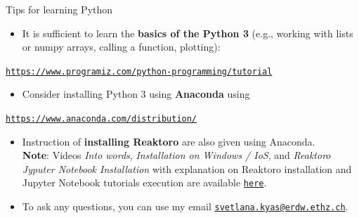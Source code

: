 \begin{frame}{Tips for learning Python}
\begin{itemize}
\item It is sufficient to learn the \alert{\textbf{basics of the Python 3}} (e.g., working with lists or numpy arrays, 
calling a function, plotting):
\end{itemize}
\begin{center}
{\href{https://www.programiz.com/python-programming/tutorial}{\textcolor{indigo(dye)}{\tt https://www.programiz.com/python-programming/tutorial}}}{\large\par}
\par\end{center}
\begin{itemize}
\item Consider installing Python 3 using \alert{\textbf{Anaconda}} using
\end{itemize}
\begin{center}
{\href{https://www.anaconda.com/distribution/}{\textcolor{indigo(dye)}{\tt https://www.anaconda.com/distribution/}}}{\large\par}
\par\end{center}
\begin{itemize}
\item Instruction of \alert{\textbf{installing Reaktoro}} are also given using Anaconda. \\
\textbf{Note}: Videos 
\emph{Into words}, 
\emph{Installation on Windows / IoS}, and 
\emph{Reaktoro Jyputer Notebook Installation} with explanation on Reaktoro installation and Jupyter Notebook tutorials execution are available  \href{https://polybox.ethz.ch/index.php/s/qStBnxUnry648U5}{\textcolor{indigo(dye)}{\tt here}}. 
%
\item To ask any questions, you can use my email \href{svetlana.kyas@erdw.ethz.ch}{\textcolor{indigo(dye)}{\tt svetlana.kyas@erdw.ethz.ch}}. 
\end{itemize}

\end{frame}
%
